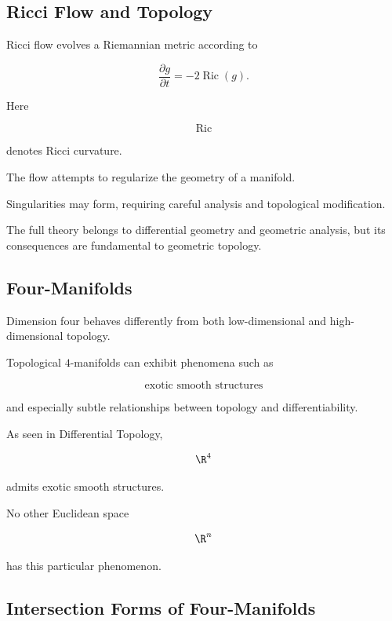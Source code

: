 \subsection{Ricci Flow and Topology}
\label{subsec:ricci-flow-topology}

Ricci flow evolves a Riemannian metric according to

\[
\boxed{
\frac{\partial g}{\partial t}
=
-2\operatorname{Ric}(g).
}
\]

Here

\[
\operatorname{Ric}
\]

denotes Ricci curvature.

The flow attempts to regularize the geometry of a manifold.

Singularities may form, requiring careful analysis and topological
modification.

The full theory belongs to differential geometry and geometric analysis,
but its consequences are fundamental to geometric topology.

\subsection{Four-Manifolds}
\label{subsec:four-manifolds-geometric-topology}

Dimension four behaves differently from both low-dimensional and
high-dimensional topology.

Topological \(4\)-manifolds can exhibit phenomena such as

\[
\boxed{
\text{exotic smooth structures}
}
\]

and especially subtle relationships between topology and differentiability.

As seen in Differential Topology,

\[
\R^4
\]

admits exotic smooth structures.

No other Euclidean space

\[
\R^n
\]

has this particular phenomenon.

\subsection{Intersection Forms of Four-Manifolds}
\label{subsec:intersection-forms-four-manifolds}

